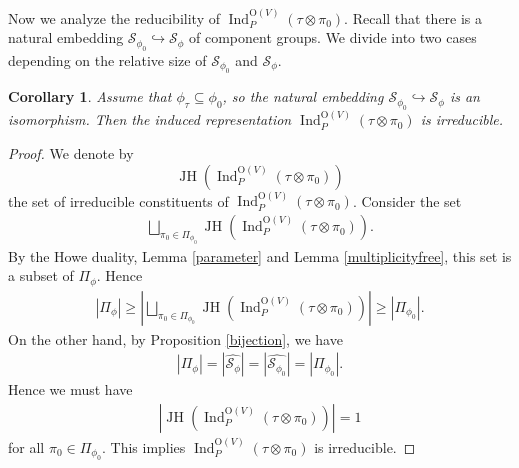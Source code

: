 \documentclass[article]{article}
\numberwithin{equation}{section}
\newtheorem{corollary}[theorem]{Corollary}
\theoremstyle{definition}
\DeclareMathOperator{\Ind}{Ind}
\DeclareMathOperator{\JH}{JH}
\begin{document}
Now we analyze the reducibility of $\Ind_{P}^{\mathrm O(V)}(\tau\otimes \pi_0)$. Recall that there is a natural embedding $\mathcal S_{\phi_{0}}\hookrightarrow \mathcal {S}_{\phi}$ of component groups. We divide into two cases depending on the relative size of $\mathcal S_{\phi_0}$ and $\mathcal {S}_{\phi}$.  
\begin{corollary}\label{embeddingisisomorphism}
	Assume that $\phi_{\tau}\subseteq \phi_0$, so the natural embedding $\mathcal S_{\phi_{0}}\hookrightarrow \mathcal {S}_{\phi}$ is an isomorphism. Then the induced representation $\Ind_{P}^{\mathrm O(V)}(\tau\otimes \pi_0)$ is irreducible. 
\end{corollary}
\begin{proof}
We denote by $$\JH(\Ind_{P}^{\mathrm O(V)}(\tau\otimes \pi_0))$$ 
the set of irreducible constituents of $\Ind_{P}^{\mathrm O(V)}(\tau\otimes \pi_0)$. Consider the set 
\begin{align*}
\bigsqcup_{\pi_0\in \Pi_{\phi_0}} \JH(\Ind_{P}^{\mathrm O(V)}(\tau\otimes \pi_0)) .
\end{align*}
By the Howe duality, Lemma \ref{parameter} and Lemma \ref{multiplicityfree}, this set is a subset of $\Pi_{\phi}$. Hence 
\begin{align*}
|\Pi_{\phi}|\geq \left|\bigsqcup_{\pi_0\in \Pi_{\phi_0}} \JH(\Ind_{P}^{\mathrm O(V)}(\tau\otimes \pi_0)) \right|\geq |\Pi_{\phi_{0}}|. 
\end{align*}
On the other hand, by Proposition \ref{bijection}, we have 
\begin{align*}
|\Pi_{\phi}|=|\widehat{\mathcal {S}_{\phi}}|=|\widehat{\mathcal S_{\phi_0}}|=|\Pi_{\phi_{0}}|. 
\end{align*}
Hence we must have 
\begin{align*}
\left| \JH(\Ind_{P}^{\mathrm O(V)}(\tau\otimes \pi_0)) \right|=1
\end{align*}
for all $\pi_0\in \Pi_{\phi_{0}}$. This implies $\Ind_{P}^{\mathrm O(V)}(\tau\otimes \pi_0)$ is irreducible. 
\end{proof}
\end{document}
